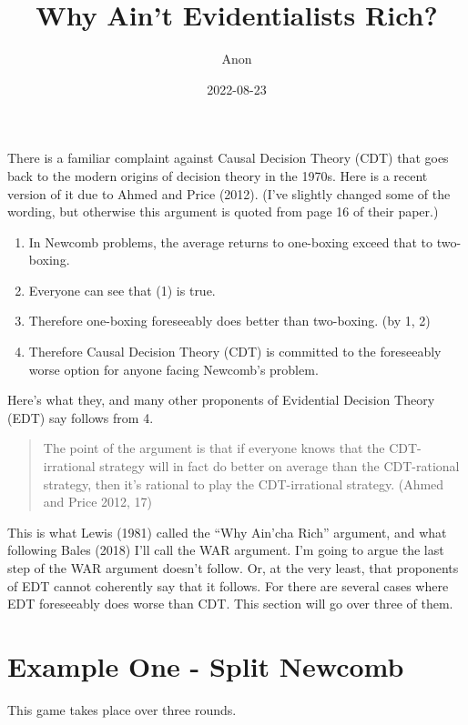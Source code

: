 \documentclass[
  12pt,
]{article}
\title{Why Ain't Evidentialists Rich?}
\author{Anon}
\date{2022-08-23}
\providecommand{\tightlist}{%
  \setlength{\itemsep}{0pt}\setlength{\parskip}{0pt}}
\begin{document}
\maketitle

There is a familiar complaint against Causal Decision Theory (CDT) that goes back to the modern origins of decision theory in the 1970s. Here is a recent version of it due to Ahmed and Price (2012). (I've slightly changed some of the wording, but otherwise this argument is quoted from page 16 of their paper.)

\begin{enumerate}
\def\labelenumi{\arabic{enumi}.}
\tightlist
\item
  In Newcomb problems, the average returns to one-boxing exceed that to two-boxing.
\item
  Everyone can see that (1) is true.
\item
  Therefore one-boxing foreseeably does better than two-boxing. (by 1, 2)
\item
  Therefore Causal Decision Theory (CDT) is committed to the foreseeably worse option for anyone facing Newcomb's problem.
\end{enumerate}

Here's what they, and many other proponents of Evidential Decision Theory (EDT) say follows from 4.

\begin{quote}
The point of the argument is that if everyone knows that the CDT-irrational strategy will in fact do better on average than the CDT-rational strategy, then it's rational to play the CDT-irrational strategy. (Ahmed and Price 2012, 17)
\end{quote}

This is what Lewis (1981) called the ``Why Ain'cha Rich'' argument, and what following Bales (2018) I'll call the WAR argument. I'm going to argue the last step of the WAR argument doesn't follow. Or, at the very least, that proponents of EDT cannot coherently say that it follows. For there are several cases where EDT foreseeably does worse than CDT. This section will go over three of them.

\hypertarget{example-one---split-newcomb}{%
\section{Example One - Split Newcomb}\label{example-one---split-newcomb}}

This game takes place over three rounds.
\end{document}
